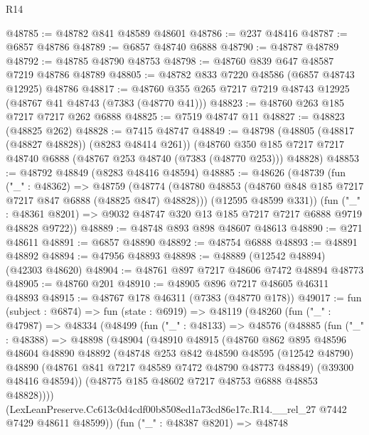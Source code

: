 \begin{lexlean}{R14}
\begin{coremodule}
@48785 := @48782 @841 @48589 @48601
@48786 := @237 @48416
@48787 := @6857 @48786
@48789 := @6857 @48740 @6888
@48790 := @48787 @48789
@48792 := @48785 @48790 @48753
@48798 := @48760 @839 @647 @48587 @7219 @48786 @48789
@48805 := @48782 @833 @7220 @48586 (@6857 @48743 @12925) @48786
@48817 := @48760 @355 @265 @7217 @7219 @48743 @12925 (@48767 @41 @48743 (@7383 (@48770 @41)))
@48823 := @48760 @263 @185 @7217 @7217 @262 @6888
@48825 := @7519 @48747 @11
@48827 := @48823 (@48825 @262)
@48828 := @7415 @48747
@48849 := @48798
    (@48805 (@48817 (@48827 @48828)) (@8283 @48414 @261))
    (@48760 @350 @185 @7217 @7217 @48740 @6888 (@48767 @253 @48740 (@7383 (@48770 @253))) @48828)
@48853 := @48792 @48849 (@8283 @48416 @48594)
@48885 := @48626
    (@48739
      (fun ("_" : @48362) =>
      @48759
        (@48774 (@48780 @48853 (@48760 @848 @185 @7217 @7217 @847 @6888 (@48825 @847) @48828)))
        (@12595 @48599 @331))
      (fun ("_" : @48361 @8201) => @9032 @48747 @320 @13 @185 @7217 @7217 @6888 @9719 @48828 @9722))
@48889 := @48748 @893 @898 @48607 @48613
@48890 := @271 @48611
@48891 := @6857 @48890
@48892 := @48754 @6888
@48893 := @48891 @48892
@48894 := @47956 @48893
@48898 := @48889 (@12542 @48894) (@42303 @48620)
@48904 := @48761 @897 @7217 @48606 @7472 @48894 @48773
@48905 := @48760 @201
@48910 := @48905 @896 @7217 @48605 @46311 @48893
@48915 := @48767 @178 @46311 (@7383 (@48770 @178))
@49017 := fun (subject : @6874) =>
  fun (state : @6919) =>
  @48119
    (@48260
      (fun ("_" : @47987) =>
      @48334
        (@48499
          (fun ("_" : @48133) =>
          @48576
            (@48885
              (fun ("_" : @48388) =>
              @48898
                (@48904
                  (@48910
                    @48915
                    (@48760
                      @862
                      @895
                      @48596
                      @48604
                      @48890
                      @48892
                      (@48748
                        @253
                        @842
                        @48590
                        @48595
                        (@12542 @48790)
                        @48890
                        (@48761 @841 @7217 @48589 @7472 @48790 @48773 @48849)
                        (@39300 @48416 @48594))
                      (@48775 @185 @48602 @7217 @48753 @6888 @48853 @48828))))
                (LexLeanPreserve.Cc613c0d4cdf00b8508ed1a73cd86e17c.R14.__rel_27
                  @7442
                  @7429
                  @48611
                  @48599))
              (fun ("_" : @48387 @8201) =>
              @48748

\end{coremodule}
\end{lexlean}
